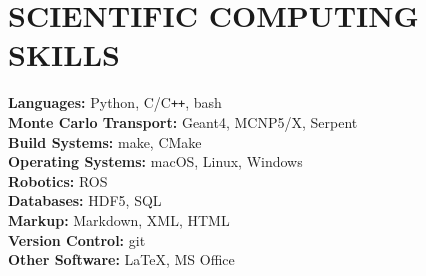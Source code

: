 \section{\small{SCIENTIFIC COMPUTING \\ SKILLS}}

\textbf{Languages:} \hfill Python, C/C\verb!++!, bash\\
\textbf{Monte Carlo Transport:} \hfill Geant4, MCNP5/X, Serpent\\
\textbf{Build Systems:} \hfill make, CMake\\
\textbf{Operating Systems:} \hfill macOS, Linux, Windows\\
\textbf{Robotics:} \hfill ROS\\
\textbf{Databases:} \hfill HDF5, SQL\\
\textbf{Markup:} \hfill Markdown, XML, HTML\\
\textbf{Version Control:} \hfill git\\
\textbf{Other Software:} \hfill \LaTeX, MS Office

%
